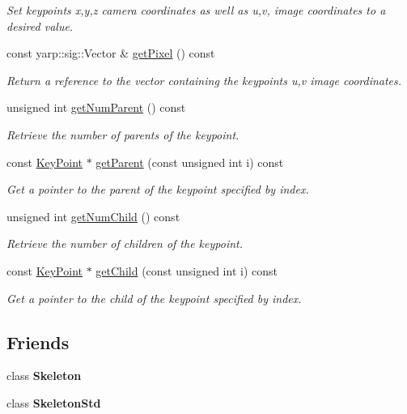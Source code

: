 \begin{DoxyCompactItemize}
\begin{DoxyCompactList}\small\item\em Set keypoint\textquotesingle{}s x,y,z camera coordinates as well as u,v, image coordinates to a desired value. \end{DoxyCompactList}\item 
const yarp\+::sig\+::\+Vector \& \hyperlink{classassistive__rehab_1_1KeyPoint_afebdf9ab021c866f00a2e8a3f9fc4c11}{get\+Pixel} () const
\begin{DoxyCompactList}\small\item\em Return a reference to the vector containing the keypoint\textquotesingle{}s u,v image coordinates. \end{DoxyCompactList}\item 
unsigned int \hyperlink{classassistive__rehab_1_1KeyPoint_acf31a6d7e9ae1be4aa992599435564ad}{get\+Num\+Parent} () const
\begin{DoxyCompactList}\small\item\em Retrieve the number of parents of the keypoint. \end{DoxyCompactList}\item 
const \hyperlink{classassistive__rehab_1_1KeyPoint}{Key\+Point} $\ast$ \hyperlink{classassistive__rehab_1_1KeyPoint_a0aa07ed9cc05471af65622fa05329cc3}{get\+Parent} (const unsigned int i) const
\begin{DoxyCompactList}\small\item\em Get a pointer to the parent of the keypoint specified by index. \end{DoxyCompactList}\item 
unsigned int \hyperlink{classassistive__rehab_1_1KeyPoint_aeb002852df51f7eaa5b719dc9b019863}{get\+Num\+Child} () const
\begin{DoxyCompactList}\small\item\em Retrieve the number of children of the keypoint. \end{DoxyCompactList}\item 
const \hyperlink{classassistive__rehab_1_1KeyPoint}{Key\+Point} $\ast$ \hyperlink{classassistive__rehab_1_1KeyPoint_a87aced4b21c5d5a8f67c7e1cb3936282}{get\+Child} (const unsigned int i) const
\begin{DoxyCompactList}\small\item\em Get a pointer to the child of the keypoint specified by index. \end{DoxyCompactList}\end{DoxyCompactItemize}
\subsection*{Friends}
\begin{DoxyCompactItemize}
\item 
\mbox{\label{classassistive__rehab_1_1KeyPoint_a6a11291b70c2cbded85d321ce539c62f}} 
class {\bfseries Skeleton}
\item 
\mbox{\label{classassistive__rehab_1_1KeyPoint_ad3de273c9c6dd0dc83202526523f8dd7}} 
class {\bfseries Skeleton\+Std}
\end{DoxyCompactItemize}


